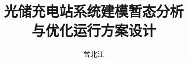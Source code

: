 \documentclass{whut-bachelor}
\title{光储充电站系统建模暂态分析\\与优化运行方案设计}	%
\author{曾北江}	%
\begin{document}
\maketitle



\tableofcontents



 



\nocite{*} %
\printbibliography	%


\end{document}
